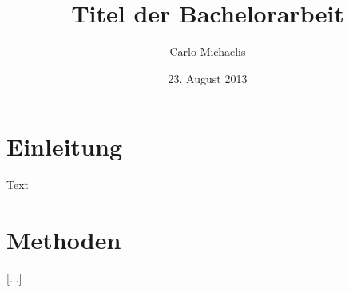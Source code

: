 \documentclass{scrreprt}
\title{Titel der Bachelorarbeit}
\author{Carlo Michaelis}
\date{23. August 2013}
\begin{document}
\maketitle
\tableofcontents

\chapter{Einleitung}

Text

\chapter{Methoden}

[...]
\end{document}
